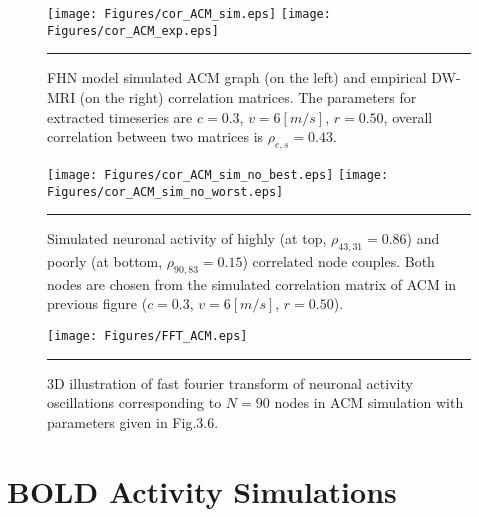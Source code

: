  
\begin{figure}[htbp]
 
  \centering
	 \texttt{[image: Figures/cor\_ACM\_sim.eps]} 
   	 \texttt{[image: Figures/cor\_ACM\_exp.eps]} 

    \rule{35em}{0.5pt}
  \caption[High correlated FHN simulation, ACM]{FHN model simulated ACM graph (on the left) and empirical DW-MRI (on the right) correlation matrices. The parameters for extracted timeseries are $c=0.3$, $v=6 [m/s]$, $r=0.50$, overall correlation between two matrices is $\rho_{e,s} = 0.43$.} 
    \label{fig:High correlated FHN simulation, ACM}
 	
\end{figure}



\begin{figure}[htbp]
 
  \centering
	 \texttt{[image: Figures/cor\_ACM\_sim\_no\_best.eps]} 
   	 \texttt{[image: Figures/cor\_ACM\_sim\_no\_worst.eps]} 

    \rule{35em}{0.5pt}
  \caption[Neural Activity Node Dynamics, ACM]{Simulated neuronal activity of highly (at top, $\rho_{43,31}=0.86$) and poorly (at bottom, $\rho_{90,83}=0.15$) correlated node couples. Both nodes are chosen from the simulated correlation matrix of ACM in previous figure ($c=0.3$, $v=6 [m/s]$, $r=0.50$).} 
    \label{fig:Neural Activity Node Dynamics, ACM}
 	
\end{figure} 




\begin{figure}[htbp]
 
  \centering
	 \texttt{[image: Figures/FFT\_ACM.eps]} 

    \rule{35em}{0.5pt}
  \caption[3D Fast Fourier Transform, FHN, ACM]{3D illustration of fast fourier transform of neuronal activity oscillations corresponding to $N=90$ nodes in ACM simulation with parameters given in Fig.3.6.} 
    \label{fig:3D Fast Fourier Transform, FHN, ACM}
 	
\end{figure}  




\section{BOLD Activity Simulations}

